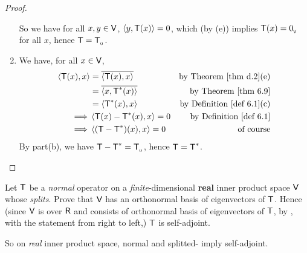 \begin{proof}
\begin{enumerate}
So we have for all \(x, y \in \textsf{V}\), \(\left< y, \textsf{T}(x) \right> = 0\), which (by (e)) implies \(\textsf{T}(x) = 0_{_{\textsf{V}}}\) for all \(x\), hence \(\textsf{T} = \textsf{T}_{_0}\).

\item We have, for all \(x \in \textsf{V}\),
\begin{align*}
    \LG \T(x), x \RG & = \conjugatet{\LG \T(x), x \RG} & \text{by \THM{d.2}(e)} \\
        & = \conjugatet{\LG x, \T^*(x) \RG} & \text{by \THM{6.9}} \\
        & = \LG \T^*(x), x \RG & \text{by \DEF{6.1}(c)} \\
    \implies & \LG \T(x) - \T^*(x), x \RG = 0 & \text{by \DEF{6.1}} \\
    \implies & \LG (\T - \T^*)(x), x \RG = 0 & \text{of course}
\end{align*}
By part(b), we have \(\textsf{T} - \textsf{T}^* = \textsf{T}_{_0}\), hence \(\textsf{T} = \textsf{T}^*\).
\end{enumerate}
\end{proof}

\begin{exercise} \label{exercise 6.4.12}
Let \(\textsf{T}\) be a \emph{normal} operator on a \emph{finite}-dimensional \textbf{real} inner product space \(\textsf{V}\) whose \CPOLY{} \emph{splits}.
Prove that \(\textsf{V}\) has an orthonormal basis of eigenvectors of \(\textsf{T}\).
Hence (since \(\textsf{V}\) is over \(\textsf{R}\) and consists of orthonormal basis of eigenvectors of \(\textsf{T}\), by , with the statement from right to left,) \(\textsf{T}\) is self-adjoint.
\end{exercise}

\begin{note}
So on \emph{real} inner product space, normal and splitted-\CPOLY{} imply self-adjoint.
\end{note}

